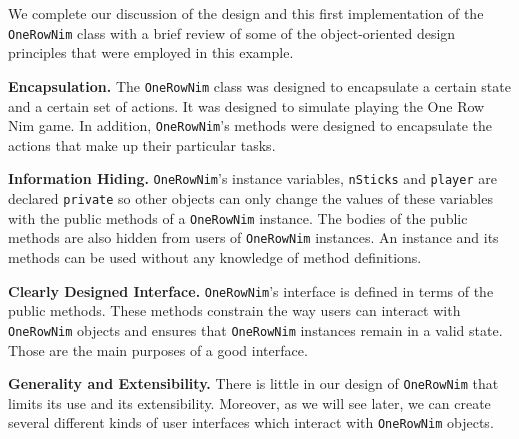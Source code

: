 \noindent We complete our discussion of the
design and this first implementation of the {\tt OneRowNim} class with
a brief review of some of the object-oriented design principles that
were employed in this example.

\begin{BL}

\item  {\bf Encapsulation.}
The {\tt OneRowNim} class was designed to encapsulate a certain state
and a certain set of actions. It was designed to simulate playing the
One Row Nim game. In addition, {\tt OneRowNim}'s methods were designed
to encapsulate the actions that make up their particular tasks.

\item  {\bf Information Hiding.}
{\tt OneRowNim}'s instance variables, {\tt nSticks} and {\tt player}
are declared {\tt private} so other objects can only change the values
of these variables with the public methods of a {\tt OneRowNim}
instance.  The bodies of the public methods are also hidden from users
of {\tt OneRowNim} instances.  An instance and its methods can be used
without any knowledge of method definitions.

\item  {\bf Clearly Designed Interface.}
{\tt OneRowNim}'s interface is defined in terms of the public methods.
These methods constrain the way users can interact with {\tt
OneRowNim} objects and ensures that {\tt OneRowNim} instances remain
in a valid state.  Those are the main purposes of a good interface.

\item  {\bf Generality and Extensibility.} There is little in our
design of \mbox{\tt OneRowNim} that limits its use and its
extensibility. Moreover, as we will see later, we can create several
different kinds of user interfaces which interact with {\tt OneRowNim}
objects.
\end{BL}

